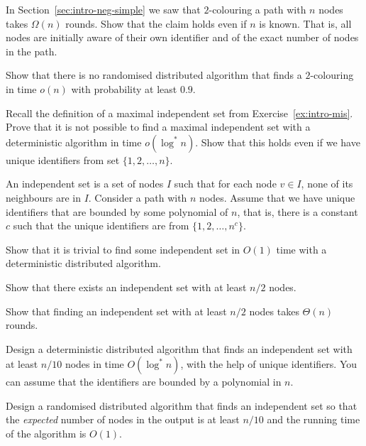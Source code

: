 \begin{ex}[known $n$]
    In Section~\ref{sec:intro-neg-simple} we saw that $2$-colouring a path with $n$ nodes takes $\Omega(n)$    rounds. Show that the claim holds even if $n$ is known. That is, all nodes are initially aware of their own identifier and of the exact number of nodes in the path.
\end{ex}

\begin{ex}
    Show that there is no randomised distributed algorithm that finds a $2$-colouring in time $o(n)$ with probability at least $0.9$.
\end{ex}

\begin{ex}
    Recall the definition of a maximal independent set from Exercise~\ref{ex:intro-mis}. Prove that it is not possible to find a maximal independent set with a deterministic algorithm in time $o(\log^* n)$. Show that this holds even if we have unique identifiers from set $\{1,2,\dotsc,n\}$.
\end{ex}

\begin{ex}
    An independent set is a set of nodes $I$ such that for each node $v \in I$, none of its neighbours are in $I$. Consider a path with $n$ nodes. Assume that we have unique identifiers that are bounded by some polynomial of $n$, that is, there is a constant $c$ such that the unique identifiers are from $\{1,2,\dotsc,n^c\}$.
    \begin{subex}
        \item Show that it is trivial to find some independent set in $O(1)$ time with a deterministic distributed algorithm.
        \item Show that there exists an independent set with at least $n/2$ nodes.
        \item Show that finding an independent set with at least $n/2$ nodes takes $\Theta(n)$ rounds.
        \item Design a deterministic distributed algorithm that finds an independent set with at least $n/10$ nodes in time $O(\log^* n)$, with the help of unique identifiers. You can assume that the identifiers are bounded by a polynomial in $n$.
        \item Design a randomised distributed algorithm that finds an independent set so that the \emph{expected} number of nodes in the output is at least $n/10$ and the running time of the algorithm is $O(1)$.
    \end{subex}
\end{ex}

